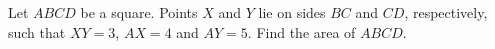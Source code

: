 Let $ABCD$ be a square. Points $X$ and $Y$ lie on sides $BC$ and $CD$, respectively, such that $XY=3$, $AX=4$ and $AY=5$. Find the area of $ABCD$.
